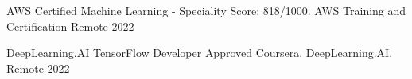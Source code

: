 

\begin{cvhonors}

  \cvhonor
    {AWS Certified Machine Learning - Speciality} %
    {Score: 818/1000. AWS Training and Certification} %
    {Remote} %
    {2022} %

  \cvhonor
  {DeepLearning.AI TensorFlow Developer} %
  {Approved Coursera. DeepLearning.AI.} %
  {Remote} %
  {2022} %

\end{cvhonors}
